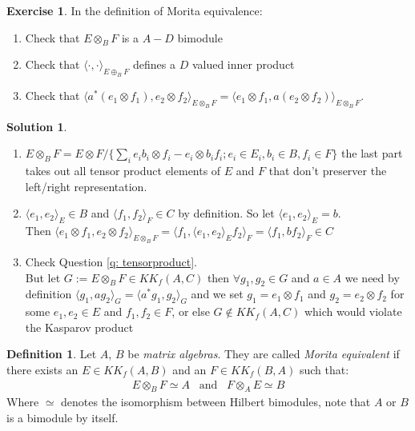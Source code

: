 \documentclass[a4paper]{article}
\theoremstyle{definition}
\newtheorem{definition}{Definition}
\theoremstyle{definition}
\theoremstyle{definition}
\theoremstyle{theorem}
\theoremstyle{theorem}
\newtheorem{exercise}{Exercise}
\theoremstyle{theorem}
\theoremstyle{definition}
\newtheorem{solution}{Solution}
\begin{document}
\begin{exercise}
    In the definition of Morita equivalence:
    \begin{enumerate}
        \item Check that $E \otimes _B F$ is a $A-D$ bimodule
        \item Check that $\langle \cdot,\cdot\rangle _{E\oplus _B F}$ defines a $D$ valued inner product
        \item Check that $\langle a^*(e_1 \otimes f_1), e_2 \otimes f_2\rangle _{E \otimes _B F} = \langle e_1 \otimes f_1, a(e_2 \otimes f_2)\rangle _{E \otimes _B F}$.
    \end{enumerate}
\end{exercise}

\begin{solution}
    \
    \begin{enumerate}
        \item $E \otimes _B F = E \otimes F / \{\sum_i e_i b_i \otimes f_i - e_i \otimes b_i f_i;
            e_i \in E_i, b_i \in B, f_i \in F\}$ the last part takes out all tensor product elements of
            $E$ and $F$ that don't preserver the left/right representation.
        \item $\langle e_1, e_2\rangle _E \in B$ and $\langle f_1, f_2\rangle _F \in C$ by definition. So let $\langle e_1, e_2\rangle _E =b$. \\
            Then $\langle e_1 \otimes f_1, e_2 \otimes f_2\rangle _{E\otimes _B F} = \langle f_1, \langle e_1, e_2\rangle _E f_2\rangle _F =
            \langle f_1, b f_2\rangle _F \in C$
        \item Check Question \ref{q: tensorproduct}.\\
            But let $G := E\otimes _B F \in KK_f(A,C)$ then $\forall g_1, g_2 \in G$ and $a \in A$ we need
            by definition $\langle g_1, ag_2\rangle _G = \langle a^*g_1, g_2\rangle _G$ and we set $g_1 = e_1 \otimes f_1$ and
            $g_2 = e_2 \otimes f_2$ for some $e_1, e_2 \in E$ and $f_1, f_2 \in F$, or else
            $G \notin KK_f(A,C)$ which would violate the Kasparov product
    \end{enumerate}
\end{solution}

\begin{definition}
    Let $A$, $B$ be \textit{matrix algebras}. They are called \textit{Morita equivalent} if there
    exists an $E \in KK_f(A, B)$ and an $F \in KK_f(B, A)$ such that:
    \begin{align*}
        E \otimes _B F \simeq A \;\;\; \text{and} \;\;\; F \otimes _A E \simeq B
    \end{align*}
    Where $\simeq$ denotes the isomorphism between Hilbert bimodules, note that $A$ or $B$ is a bimodule by
    itself.
\end{definition}
\end{document}
